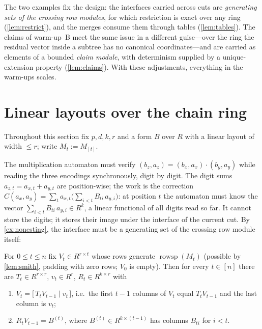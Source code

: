 \documentclass[a4paper,UKenglish,autoref,anonymous]{lipics-v2021}
\newcommand{\R}{R}                                   %
\newcommand{\rs}{\operatorname{rowsp}}
\begin{document}
The two examples fix the design: the interfaces carried across cuts are
\emph{generating sets of the crossing row modules}, for which restriction
is exact over any ring (\autoref{lem:restrict}), and the merges consume
them through tables (\autoref{lem:tables}). The claims of warm-up~B meet
the same issue in a different guise---over the ring the residual vector
inside a subtree has no canonical coordinates---and are carried as
elements of a bounded \emph{claim module}, with determinism supplied by a
unique-extension property (\autoref{lem:claims}). With these
adjustments, everything in the warm-ups scales.

\section{Linear layouts over the chain ring}
\label{sec:word}

Throughout this section fix $p, d, k, r$ and a form $B$ over $\R$ with a
linear layout of width $\le r$; write $M_t := M_{[t]}$.

The multiplication automaton must verify $(b_z, a_z) = (b_x, a_x) \cdot
(b_y, a_y)$ while reading the three encodings synchronously, digit by
digit. The digit sums $a_{z,t} = a_{x,t} + a_{y,t}$ are position-wise;
the work is the correction $C(a_x, a_y) = \sum_t a_{x,t} \bigl( \sum_{i
< t} B_{ti}\, a_{y,i} \bigr)$: at position $t$ the automaton must know
the vector $\sum_{i<t} B_{ti}\, a_{y,i} \in \R^k$, a linear functional
of all digits read so far. It cannot store the digits; it stores their
image under the interface of the current cut. By
\autoref{ex:nonesting}, the interface must be a generating set of the
crossing row module itself:

\begin{lemma}
\label{lem:stream}
For $0 \le t \le n$ fix $V_t \in \R^{r \times t}$ whose rows generate
$\rs(M_t)$ (possible by \autoref{lem:smith}, padding with zero rows;
$V_0$ is empty). Then for every $t \in [n]$ there are $T_t \in \R^{r
\times r}$, $v_t \in \R^{r}$, $R_t \in \R^{k \times r}$ with
\begin{enumerate}
\item $V_t = \bigl[\, T_t V_{t-1} \;\big|\; v_t \,\bigr]$, i.e.\ the
  first $t-1$ columns of $V_t$ equal $T_t V_{t-1}$ and the last column
  is $v_t$;
\item $R_t V_{t-1} = B^{(t)}$, where $B^{(t)} \in \R^{k \times (t-1)}$
  has columns $B_{ti}$ for $i < t$.
\end{enumerate}
\end{lemma}
\end{document}
